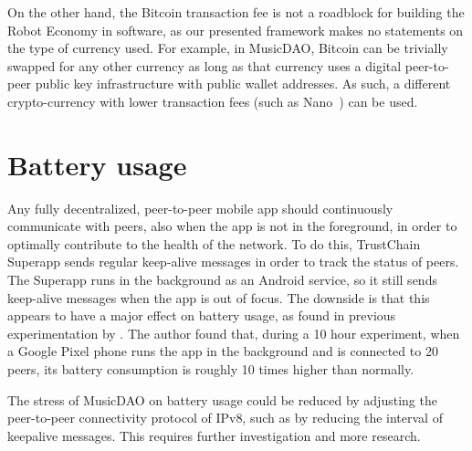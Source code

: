 On the other hand, the Bitcoin transaction fee is not a roadblock for building the Robot Economy in software, as our presented framework makes no statements on the type of currency used. For example, in MusicDAO, Bitcoin can be trivially swapped for any other currency as long as that currency uses a digital peer-to-peer public key infrastructure with public wallet addresses. As such, a different crypto-currency with lower transaction fees (such as Nano~\citep{lemahieu2018nano}) can be used.

\section{Battery usage}
Any fully decentralized, peer-to-peer mobile app should continuously communicate with peers, also when the app is not in the foreground, in order to optimally contribute to the health of the network. To do this, TrustChain Superapp sends regular keep-alive messages in order to track the status of peers. The Superapp runs in the background as an Android service, so it still sends keep-alive messages when the app is out of focus. The downside is that this appears to have a major effect on battery usage, as found in previous experimentation by \cite{mattskala2020}. The author found that, during a 10 hour experiment, when a Google Pixel phone runs the app in the background and is connected to 20 peers, its battery consumption is roughly 10 times higher than normally.

The stress of MusicDAO on battery usage could be reduced by adjusting the peer-to-peer connectivity protocol of IPv8, such as by reducing the interval of keepalive messages. This requires further investigation and more research.